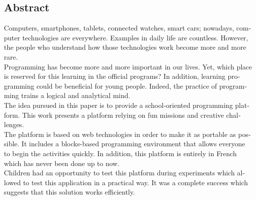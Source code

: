 \begin{otherlanguage}{english}
\section*{Abstract}
Computers, smartphones, tablets, connected watches, smart cars; nowadays, computer technologies are everywhere. Examples in daily life are countless. However, the people who understand how those technologies work become more and more rare. \\

Programming has become more and more important in our lives. Yet, which place is reserved for this learning in the official programs? In addition, learning programming could be beneficial for young people. Indeed, the practice of programming trains a logical and analytical mind. \\

The idea pursued in this paper is to provide a school-oriented programming platform. This work presents a platform relying on fun missions and creative challenges. \\

The platform is based on web technologies in order to make it as portable as possible. It includes a blocks-based programming environment that allows everyone to begin the activities quickly. In addition, this platform is entirely in French which has never been done up to now. \\

Children had an opportunity to test this platform during experiments which allowed to test this application in a practical way. It was a complete success which suggests that this solution works efficiently.
\end{otherlanguage}
